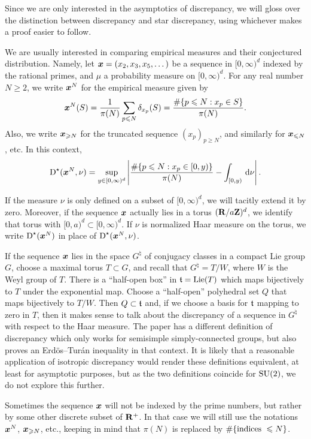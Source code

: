 Since we are only interested in the asymptotics of discrepancy, we will 
gloss over the distinction between discrepancy and star discrepancy, using 
whichever makes a proof easier to follow. 

We are usually interested in comparing empirical measures and their conjectured 
distribution. Namely, let ${\boldsymbol x} = (x_2,x_3,x_5,\dots)$ be a sequence in 
$[0,\infty)^d$ indexed by the rational primes, and $\mu$ a probability measure 
on $[0,\infty)^d$. For any real number $N\geqslant 2$, we write ${\boldsymbol x}^N$ for the 
empirical measure given by 
\[
	{\boldsymbol x}^N(S) = \frac{1}{\pi(N)} \sum_{p\leqslant N} \delta_{x_p}(S) = \frac{\# \{p\leqslant N : x_p\in S\}}{\pi(N)} .
\]
Also, we write ${\boldsymbol x}_{\geqslant N}$ for the truncated sequence 
$(x_p)_{p\geqslant N}$, and similarly for ${\boldsymbol x}_{\leqslant N}$, etc. In this 
context, 
\[
	\operatorname{D}^\star({\boldsymbol x}^N,\nu) = \sup_{y\in [0,\infty)^d} \left| \frac{\# \{p\leqslant N : x_p \in [0,y)\}}{\pi(N)} - \int_{[0,y)} \, \mathrm{d}\nu\right| .
\]

If the measure $\nu$ is only defined on a subset of $[0,\infty)^d$, we will 
tacitly extend it by zero. Moreover, if the sequence ${\boldsymbol x}$ actually lies in a 
torus $(\mathbf{R}/a \mathbf{Z})^d$, we identify that torus with  
$[0,a)^d\subset [0,\infty)^d$. If $\nu$ is normalized Haar measure on the 
torus, we write $\operatorname{D}^\star({\boldsymbol x}^N)$ in place of $\operatorname{D}^\star({\boldsymbol x}^N, \nu)$. 

If the sequence ${\boldsymbol x}$ lies in the space $G^\natural$ of conjugacy classes in a 
compact Lie group $G$, choose a maximal torus $T\subset G$, and recall that 
$G^\natural = T/W$, where $W$ is the Weyl group of $T$. There is a ``half-open 
box'' in $\mathfrak{t} = \operatorname{Lie}(T)$ which maps bijectively to $T$ under the exponential 
map. Choose a ``half-open'' polyhedral set $Q$ that maps bijectively to $T/W$. 
Then $Q\subset \mathfrak{t}$ and, if we choose a basis for $\mathfrak{t}$ mapping to zero in 
$T$, then it makes sense to talk about the discrepancy of a sequence in 
$G^\natural$ with respect to the Haar measure. The paper 
\cite{rosengarten-2013} has a different definition of discrepancy which only 
works for semisimple simply-connected groups, but also proves an 
Erd\"os--Tur\'an inequality in that context. It is likely that a reasonable 
application of isotropic discrepancy would render these definitions equivalent, 
at least for asymptotic purposes, but as the two definitions coincide for 
$\operatorname{SU}(2)$, we do not explore this further. 

Sometimes the sequence ${\boldsymbol x}$ will not be indexed by the prime numbers, but 
rather by some other discrete subset of $\mathbf{R}^+$. In that case we will still 
use the notations ${\boldsymbol x}^N$, ${\boldsymbol x}_{\geqslant N}$, etc., keeping in mind that 
$\pi(N)$ is replaced by $\#\{\textnormal{indices }\leqslant N\}$. 






